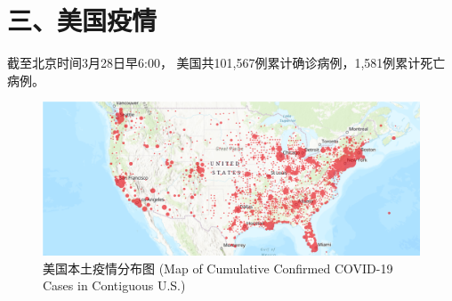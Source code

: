 \documentclass[11,]{article}
\begin{document}
\begin{figure}[htbp]
\centering  %
\caption{}
\label{Fig.main}
\end{figure}

\hypertarget{section-3}{%
\section{\texorpdfstring{\textcolor{glaucous}{三、美国疫情}}{}}\label{section-3}}

截至北京时间3⽉28⽇早6:00，
美国共101,567例累计确诊病例，1,581例累计死亡病例。

\begin{figure}[htbp] 
\centering %
\includegraphics[]{./test/covid4.png} %
\caption{美国本土疫情分布图 (Map of Cumulative Confirmed COVID-19 Cases in Contiguous U.S.)} %
\label{} %
\end{figure}
\end{document}
